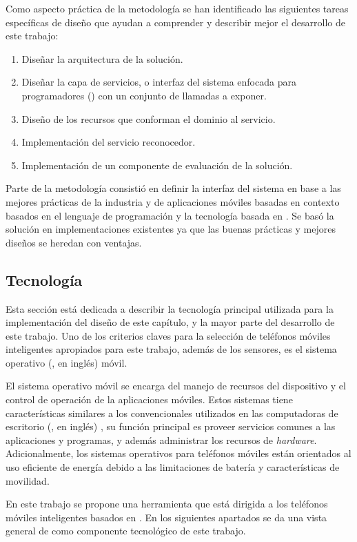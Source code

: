 Como aspecto práctica de la metodología se han identificado las siguientes
tareas específicas de diseño que ayudan a comprender y describir mejor
el desarrollo de este trabajo:
\begin{enumerate}
\item Diseñar la arquitectura de la solución.
\item Diseñar la capa de servicios, o interfaz del sistema enfocada para
programadores () con un conjunto de llamadas a exponer.
\item Diseño de los recursos que conforman el dominio al servicio.
\item Implementación del servicio reconocedor.
\item Implementación de un componente de evaluación de la solución.
\end{enumerate}
Parte de la metodología consistió en definir la interfaz del sistema
en base a las mejores prácticas de la industria y de aplicaciones
móviles basadas en contexto basados en el lenguaje de programación
 y la tecnología basada en . Se basó la
solución en implementaciones existentes \cite{Google2016m} ya que
las buenas prácticas y mejores diseños se heredan con ventajas.

\subsection{Tecnología}

Esta sección está dedicada a describir la tecnología principal utilizada
para la implementación del diseño de este capítulo, y la mayor parte
del desarrollo de este trabajo. Uno de los criterios claves para la
selección de teléfonos móviles inteligentes apropiados para este trabajo,
además de los sensores, es el sistema operativo (, en inglés)
móvil. 

El sistema operativo móvil se encarga del manejo de recursos del dispositivo
y el control de operación de la aplicaciones móviles. Estos sistemas
tiene características similares a los convencionales utilizados en
las computadoras de escritorio (, en inglés) , su función
principal es proveer servicios comunes a las aplicaciones y programas,
y además administrar los recursos de \emph{hardware}. Adicionalmente,
los sistemas operativos para teléfonos móviles están orientados al
uso eficiente de energía debido a las limitaciones de batería y características
de movilidad. 

En este trabajo se propone una herramienta que está dirigida a los
teléfonos móviles inteligentes basados en . En los
siguientes apartados se da una vista general de  como
componente tecnológico de este trabajo.

